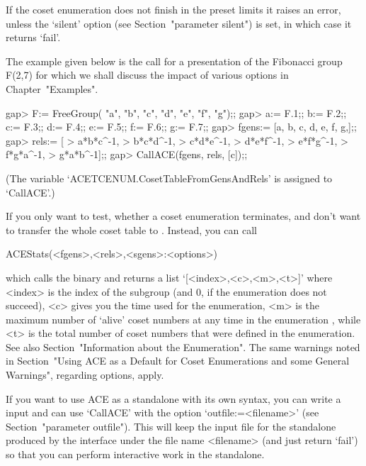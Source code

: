 If the coset enumeration does not finish in the preset limits it raises
an error, unless the  `silent' option (see Section~"parameter silent") 
is set, in which case it  returns  `fail'.  

The  example  given  below is  the  call  for  a presentation  of  the
Fibonacci  group F(2,7)  for  which  we shall  discuss  the impact  of
various options in Chapter~"Examples".

\begintt
gap> F:= FreeGroup( "a", "b", "c", "d", "e", "f", "g");;
gap> a:= F.1;; b:= F.2;; c:= F.3;; d:= F.4;; e:= F.5;; f:= F.6;; g:= F.7;;
gap> fgens:= [a, b, c, d, e, f, g,];;
gap> rels:= [
> a*b*c^-1,
> b*c*d^-1,
> c*d*e^-1,
> d*e*f^-1,
> e*f*g^-1,
> f*g*a^-1,
> g*a*b^-1];;
gap> CallACE(fgens, rels, [c]);;
\endtt

(The  variable  `ACETCENUM.CosetTableFromGensAndRels'  is assigned  to
`CallACE'.)

If you only want to  test, whether a coset enumeration terminates, and
don't want to  transfer the whole coset table  to {\GAP}. Instead, you
can call

\>ACEStats(<fgens>,<rels>,<sgens>:<options>)

which    calls    the   {\ACE}    binary    and    returns   a    list
`[<index>,<c>,<m>,<t>]'  where <index>  is the  index of  the subgroup
(and $0$, if the enumeration does not succeed), <c> gives you the time
used for the enumeration, <m> is the maximum number of \lq alive' coset
numbers at any time in the enumeration , while <t> is the total number
of  coset numbers  that  were  defined in  the  enumeration. See  also
Section~"Information about the Enumeration".   The same warnings noted
in     Section~"Using ACE as a Default for Coset Enumerations and some 
General Warnings", regarding options, apply.


If you want  to use ACE as  a standalone with its own  syntax, you can
write  a  {\GAP}   input  and  can  use  `CallACE'   with  the  option
`outfile:=<filename>' (see Section~"parameter  outfile").  This   will
keep the input file for the {\ACE}  standalone produced by the  {\GAP}
interface under the file name <filename> (and  just return `fail')  so
that you can perform  interactive work in the standalone.


